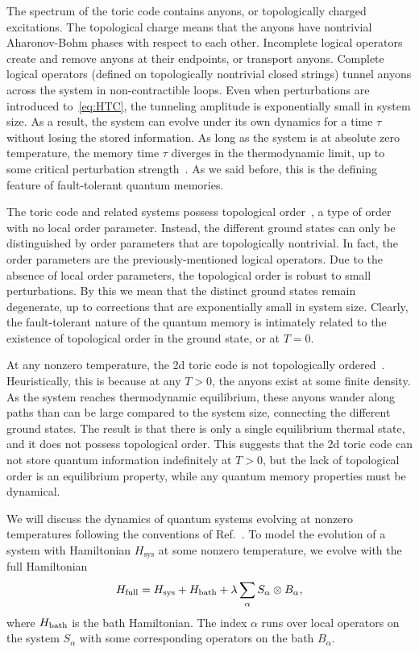 The spectrum of the toric code contains anyons, or topologically charged excitations. The topological charge means that the anyons have nontrivial Aharonov-Bohm phases with respect to each other. Incomplete logical operators create and remove anyons at their endpoints, or  transport anyons. Complete logical operators (defined on topologically nontrivial closed strings) tunnel anyons across the system in non-contractible loops.  Even when perturbations are introduced to~\eqref{eq:HTC}, the tunneling amplitude is exponentially small in system size. As a result, the system can evolve under its own dynamics for a time $\tau$ without losing the stored information. As long as the system is at absolute zero temperature, the memory time $\tau$ diverges in the thermodynamic limit, up to some critical perturbation strength~\cite{Dennis2002Topological}. As we said before, this is the defining feature of fault-tolerant quantum memories.

The toric code and related systems possess topological order~\cite{Wen1990Topological}, a type of order with no local order parameter. Instead, the different ground states can only be distinguished by order parameters that are topologically nontrivial. In fact, the order parameters are the previously-mentioned logical operators. Due to the absence of local order parameters, the topological order is robust to small perturbations. By this we mean that the distinct ground states remain degenerate, up to corrections that are exponentially small in system size. Clearly, the fault-tolerant nature of the quantum memory is intimately related to the existence of topological order in the ground state, or at $T=0$.

At any nonzero temperature, the 2d toric code is not topologically ordered~\cite{Hastings2011Topological}. Heuristically, this is because at any $T>0$, the anyons exist at some finite density. As the system reaches thermodynamic equilibrium, these anyons wander along paths than can be large compared to the system size, connecting the different ground states. The result is that there is only a single equilibrium thermal state, and it does not possess topological order. This suggests that the 2d toric code can not store quantum information indefinitely at $T>0$, but the lack of topological order is an equilibrium property, while any quantum memory properties must be dynamical. 

We will discuss the dynamics of quantum systems evolving at nonzero temperatures following the conventions of Ref.~\cite{RobertsBartlett2020}. To model the evolution of a system with Hamiltonian $H_\text{sys}$ at some nonzero temperature, we evolve with the full Hamiltonian
\begin{align}
H_\text{full} = H_{\text{sys}} + H_{\text{bath}} + \lambda \sum_\alpha S_\alpha \otimes B_\alpha, \label{eqn:bath}
\end{align}
where $H_{\text{bath}}$ is the bath Hamiltonian. The index $\alpha$ runs over local operators on the system $S_\alpha$ with some corresponding operators on the bath $B_\alpha$. 

